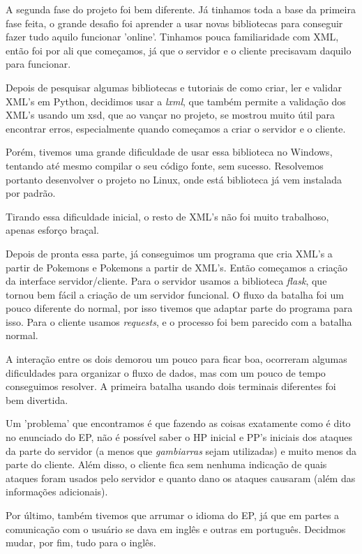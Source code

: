 \documentclass[a4paper]{article}
\begin{document}
  A segunda fase do projeto foi bem diferente. Já tinhamos toda a base da primeira fase
feita, o grande desafio foi aprender a usar novas bibliotecas para conseguir fazer tudo
aquilo funcionar 'online'. Tinhamos pouca familiaridade com XML, então foi por ali que 
começamos, já que o servidor e o cliente precisavam daquilo para funcionar.

   Depois de pesquisar algumas bibliotecas e tutoriais de como criar, ler e validar XML's
em Python, decidimos usar a \emph{lxml}, que também permite a validação dos XML's usando
um xsd, que ao vançar no projeto, se mostrou muito útil para encontrar erros, especialmente quando
começamos a criar o servidor e o cliente.

   Porém, tivemos uma grande dificuldade de usar essa biblioteca no Windows, tentando até
mesmo compilar o seu código fonte, sem sucesso. Resolvemos portanto desenvolver o projeto no
Linux, onde está biblioteca já vem instalada por padrão. 

    Tirando essa dificuldade inicial, o resto de XML's não foi muito trabalhoso, apenas
esforço braçal.

   Depois de pronta essa parte, já conseguimos um programa que cria XML's a partir de
Pokemons e Pokemons a partir de XML's. Então começamos a criação da interface servidor/cliente.
Para o servidor usamos a biblioteca \emph{flask}, que tornou bem fácil a criação de um servidor
funcional. O fluxo da batalha foi um pouco diferente do normal, por isso tivemos que adaptar
parte do programa para isso. Para o cliente usamos \emph{requests}, e o processo foi bem parecido
com a batalha normal.

   A interação entre os dois demorou um pouco para ficar boa, ocorreram algumas dificuldades
para organizar o fluxo de dados, mas com um pouco de tempo conseguimos resolver. A primeira batalha
usando dois terminais diferentes foi bem divertida.

   Um 'problema' que encontramos é que fazendo as coisas exatamente como é dito no enunciado
do EP, não é possível saber o HP inicial e PP's iniciais dos ataques da parte do servidor (a 
menos que \emph{gambiarras} sejam utilizadas) e muito menos da parte do cliente. Além disso, o
cliente fica sem nenhuma indicação de quais ataques foram usados pelo servidor e quanto dano
os ataques causaram (além das informações adicionais).

   Por último, também tivemos que arrumar o idioma do EP, já que em partes a comunicação com
o usuário se dava em inglês e outras em português. Decidmos mudar, por fim, tudo para o inglês.
\end{document}
